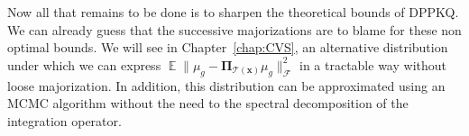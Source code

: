 \documentclass[twoside,11pt]{book}
\newtheorem{theorem}{Theorem}
\numberwithin{theorem}{chapter}
\numberwithin{definition}{chapter}
\numberwithin{proposition}{chapter}
\numberwithin{corollary}{chapter}
\numberwithin{example}{chapter}
\numberwithin{lemma}{chapter}
\numberwithin{assumption}{chapter}
\numberwithin{equation}{chapter}
\numberwithin{figure}{chapter}
\DeclareMathOperator{\DPP}{\mathrm{DPP}}
\DeclareMathOperator{\EX}{\mathbb{E}}
\DeclareMathOperator{\F}{\mathcal{F}}
\begin{document}



Now all that remains to be done is to sharpen the theoretical bounds of DPPKQ. We can already guess that the successive majorizations are to blame for these non optimal bounds. We will see in Chapter~\ref{chap:CVS}, an alternative distribution under which we can express $\EX \|\mu_{g} - \bm{\Pi}_{\mathcal{T}(\bm{x})} \mu_{g}\|_{\F}^{2}$ in a tractable way without loose majorization. In addition, this distribution can be approximated using an MCMC algorithm without the need to the spectral decomposition of the integration operator.
\end{document}

